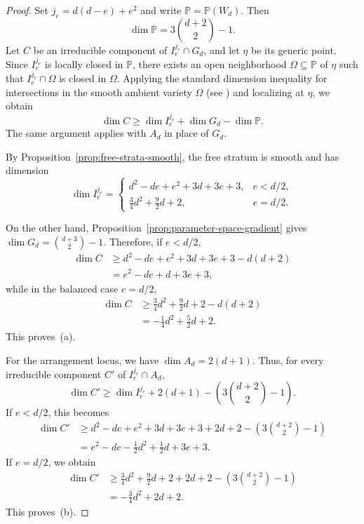 \documentclass[11pt]{amsart} %
\theoremstyle{definition}
\begin{document}
\begin{proof}
Set \(j_e=d(d-e)+e^2\) and write \(
\mathbb P=\mathbb P(W_d)\). Then
\[
\dim \mathbb P
=
3\binom{d+2}{2}-1.
\]
Let $C$ be an irreducible component of
$I_e^{j_e}\cap G_d$, and let $\eta$ be its generic point.
Since $I_e^{j_e}$ is locally closed in $\mathbb P$, there exists an
open neighborhood $\Omega\subseteq\mathbb P$ of $\eta$ such that
$I_e^{j_e}\cap\Omega$ is closed in $\Omega$. Applying the standard
dimension inequality for intersections in the smooth ambient variety
$\Omega$ (see \cite[I, Theorem~7.2]{hartshorne2013algebraic}) and
localizing at $\eta$, we obtain
\[
\dim C
\geq
\dim I_e^{j_e}
+
\dim G_d
-
\dim\mathbb P.
\]
The same argument applies with $A_d$ in place of $G_d$.

By Proposition~\ref{prop:free-strata-smooth}, the free stratum is
smooth and has dimension
\[
\dim I_e^{j_e}
=
\begin{cases}
d^2-de+e^2+3d+3e+3,
& e<d/2,\\[1mm]
\displaystyle
\frac34d^2+\frac92d+2,
& e=d/2.
\end{cases}
\]

On the other hand, Proposition~\ref{prop:parameter-space-gradient}
gives \(\dim G_d=\binom{d+3}{2}-1\). Therefore, if $e<d/2$,
\begin{align*}
\dim C
&\geq
d^2-de+e^2+3d+3e+3-d(d+2)\\
&=
e^2-de+d+3e+3,
\end{align*}
while in the balanced case $e=d/2$,
\begin{align*}
\dim C
&\geq
\frac34d^2+\frac92d+2-d(d+2)\\
&=
-\frac14d^2+\frac52d+2.
\end{align*}
This proves~(a).

For the arrangement locus, we have \(\dim A_d=2(d+1)\). Thus, for every irreducible component $C'$ of
$I_e^{j_e}\cap A_d$,
\[
\dim C'
\geq
\dim I_e^{j_e}
+
2(d+1)
-
\left(3\binom{d+2}{2}-1\right).
\]
If $e<d/2$, this becomes
\begin{align*}
\dim C'
&\geq
d^2-de+e^2+3d+3e+3
+2d+2
-\left(3\binom{d+2}{2}-1\right)\\
&=
e^2-de-\frac12d^2+\frac12d+3e+3.
\end{align*}
If $e=d/2$, we obtain
\begin{align*}
\dim C'
&\geq
\frac34d^2+\frac92d+2
+2d+2
-\left(3\binom{d+2}{2}-1\right)\\
&=
-\frac34d^2+2d+2.
\end{align*}
This proves~(b).


\end{proof}
\end{document}

